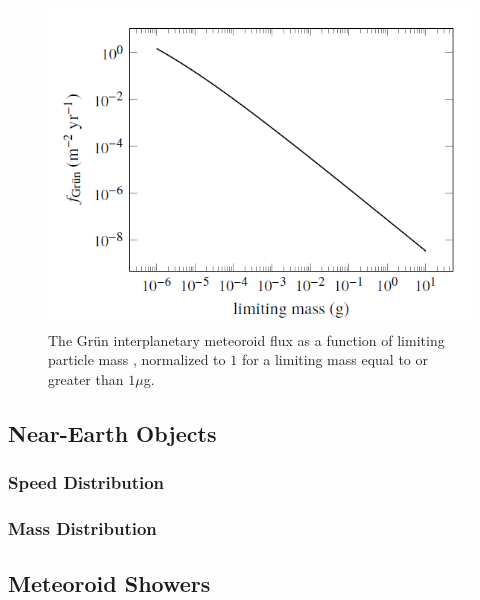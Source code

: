 \documentclass{article}
\begin{document}
\begin{figure}[!htb]
	\centering
	\includegraphics[scale=0.65]{MEM_UG_Fig2.1_partile-mass-distribution.PNG}
	\caption{The Gr{\"u}n interplanetary meteoroid flux as a function of limiting particle mass \citep[Figure 1]{moorhead2019nasa}, normalized to $1$ for a limiting mass equal to or greater than $1\mu$g.}\label{fig:MEM_UG_Fig2.1_partile-mass-distribution}
\end{figure}

	
\subsection{Near-Earth Objects}\label{ssec:Near-Earth Objects}


\subsubsection{Speed Distribution}


\subsubsection{Mass Distribution}




\subsection{Meteoroid Showers}\label{ssec:Meteoroid Showers}

	
\end{document}
